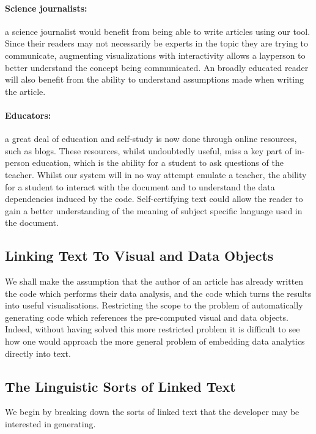 \paragraph{Science journalists:} a science journalist would benefit from being able to write articles using our tool.
Since their readers may not necessarily be experts in the topic they are trying to communicate, augmenting visualizations
with interactivity allows a layperson to better understand the concept being communicated. An broadly educated reader
will also benefit from the ability to understand assumptions made when writing the article.

\paragraph{Educators:} a great deal of education and self-study is now done through online resources, such as blogs.
These resources, whilst undoubtedly useful, miss a key part of in-person education, which is the ability for a student
to ask questions of the teacher. Whilst our system will in no way attempt emulate a teacher, the ability for a student
to interact with the document and to understand the data dependencies induced by the code. Self-certifying text could
allow the reader to gain a better understanding of the meaning of subject specific language used in the document. 

\subsection{Linking Text To Visual and Data Objects}
We shall make the assumption that the author of an article has already written the code which performs
their data analysis, and the code which turns the results into useful visualisations. Restricting the scope to the problem of
automatically generating code which references the pre-computed visual and data objects.
Indeed, without having solved this more restricted problem it is difficult to see how one would approach
the more general problem of embedding data analytics directly into text.

\subsection{The Linguistic Sorts of Linked Text}
We begin by breaking down the sorts of linked text that the developer may
be interested in generating. 

